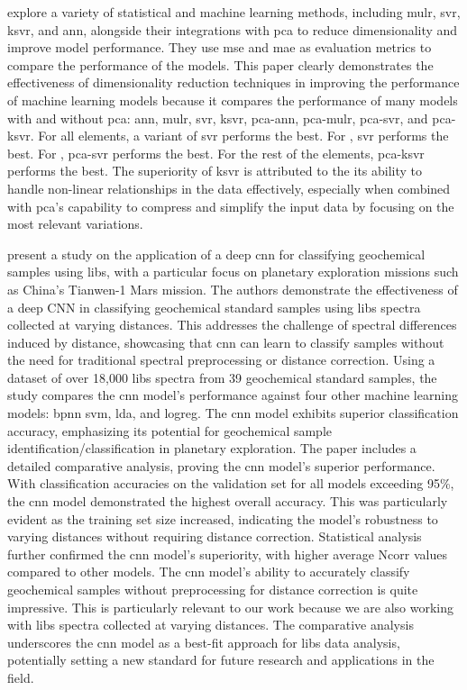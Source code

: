 \citet{rezaei_dimensionality_reduction} explore a variety of statistical and machine learning methods, including \gls{mulr}, \gls{svr}, \gls{ksvr}, and \gls{ann}, alongside their integrations with \gls{pca} to reduce dimensionality and improve model performance.
They use \gls{mse} and \gls{mae} as evaluation metrics to compare the performance of the models.
This paper clearly demonstrates the effectiveness of dimensionality reduction techniques in improving the performance of machine learning models because it compares the performance of many models with and without \gls{pca}: \gls{ann}, \gls{mulr}, \gls{svr}, \gls{ksvr}, \gls{pca}-\gls{ann}, \gls{pca}-\gls{mulr}, \gls{pca}-\gls{svr}, and \gls{pca}-\gls{ksvr}.
For all elements, a variant of \gls{svr} performs the best.
For , \gls{svr} performs the best.
For , \gls{pca}-\gls{svr} performs the best.
For the rest of the elements, \gls{pca}-\gls{ksvr} performs the best.
The superiority of \gls{ksvr} is attributed to the its ability to handle non-linear relationships in the data effectively, especially when combined with \gls{pca}'s capability to compress and simplify the input data by focusing on the most relevant variations.

\citet{yang_laser-induced_2022} present a study on the application of a deep \gls{cnn} for classifying geochemical samples using \gls{libs}, with a particular focus on planetary exploration missions such as China's Tianwen-1 Mars mission.
The authors demonstrate the effectiveness of a deep CNN in classifying geochemical standard samples using \gls{libs} spectra collected at varying distances.
This addresses the challenge of spectral differences induced by distance, showcasing that \gls{cnn} can learn to classify samples without the need for traditional spectral preprocessing or distance correction.
Using a dataset of over 18,000 \gls{libs} spectra from 39 geochemical standard samples, the study compares the \gls{cnn} model's performance against four other machine learning models: \gls{bpnn} \gls{svm}, \gls{lda}, and \gls{logreg}.
The \gls{cnn} model exhibits superior classification accuracy, emphasizing its potential for geochemical sample identification/classification in planetary exploration.
The paper includes a detailed comparative analysis, proving the \gls{cnn} model's superior performance.
With classification accuracies on the validation set for all models exceeding 95\%, the \gls{cnn} model demonstrated the highest overall accuracy.
This was particularly evident as the training set size increased, indicating the model's robustness to varying distances without requiring distance correction.
Statistical analysis further confirmed the \gls{cnn} model's superiority, with higher average Ncorr values compared to other models.
The \gls{cnn} model's ability to accurately classify geochemical samples without preprocessing for distance correction is quite impressive.
This is particularly relevant to our work because we are also working with \gls{libs} spectra collected at varying distances.
The comparative analysis underscores the \gls{cnn} model as a best-fit approach for \gls{libs} data analysis, potentially setting a new standard for future research and applications in the field.

